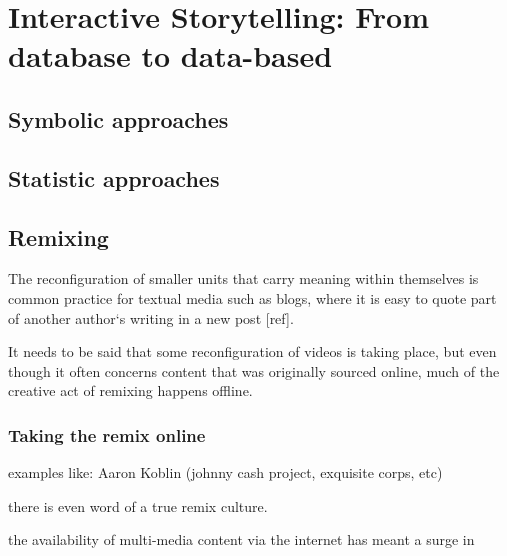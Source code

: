 \chapter{Interactive Storytelling: From database to data-based}
\label{ch:storytelling}
\section{Symbolic approaches}
\label{sec:symbolic}

\cite{Vilmos:2011wv,RodrigoLaiolaGuimaraes:2011tl,Ursu:2009gc}

\section{Statistic approaches}
\label{sec:statistic}

\section{Remixing}

The reconfiguration of smaller units that carry meaning within themselves is common practice for textual media such as blogs, where it is easy to quote part of  another author`s writing in a new post [ref]. 

It needs to be said that some reconfiguration of videos is taking place, but even though it often concerns content that was originally sourced online, much of the creative act of remixing happens offline.


\subsection{Taking the remix online}

examples like: Aaron Koblin (johnny cash project, exquisite corps, etc)

there is even word of a true remix culture.

the availability of multi-media content via the internet has meant a surge in 
